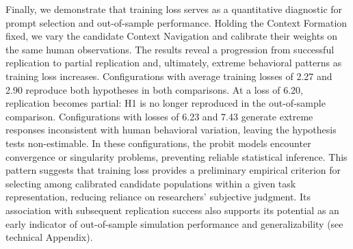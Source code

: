 \documentclass[12pt,letterpaper]{article}
\begin{document}
Finally, we demonstrate that training loss serves as a quantitative diagnostic for prompt selection and out-of-sample performance. Holding the Context Formation fixed, we vary the candidate Context Navigation and calibrate their weights on the same human observations. The results reveal a progression from successful replication to partial replication and, ultimately, extreme behavioral patterns as training loss increases. Configurations with average training losses of 2.27 and 2.90 reproduce both hypotheses in both comparisons. At a loss of 6.20, replication becomes partial: H1 is no longer reproduced in the out-of-sample comparison. Configurations with losses of 6.23 and 7.43 generate extreme responses inconsistent with human behavioral variation, leaving the hypothesis tests non-estimable. In these configurations, the probit models encounter convergence or singularity problems, preventing reliable statistical inference. This pattern suggests that training loss provides a preliminary empirical criterion for selecting among calibrated candidate populations within a given task representation, reducing reliance on researchers' subjective judgment. Its association with subsequent replication success also supports its potential as an early indicator of out-of-sample simulation performance and generalizability (see technical Appendix).
\end{document}
